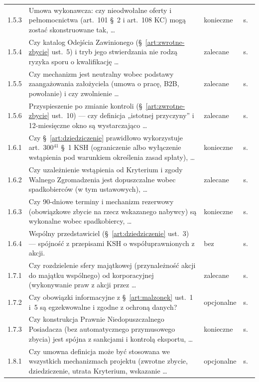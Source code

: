 \documentclass[12pt,a4paper]{report}
\begin{document}
{\begin{longtable}{@{}p{1.2cm} p{9.6cm} p{2.3cm} p{1.4cm}@{}}
1.5.3 & Umowa wykonawcza: czy nieodwołalne oferty i pełnomocnictwa (art.~101 §~2 i art.~108 KC) mogą zostać skonstruowane tak, \ldots & konieczne & s.~\pageref{memo:1.5.3} \\
1.5.4 & Czy katalog Odejścia Zawinionego (§~\ref{art:zwrotne-zbycie} ust.~5) i tryb jego stwierdzania nie rodzą ryzyka sporu o kwalifikację \ldots & zalecane & s.~\pageref{memo:1.5.4} \\
1.5.5 & Czy mechanizm jest neutralny wobec podstawy zaangażowania założyciela (umowa o pracę, B2B, powołanie) i czy zwolnienie \ldots & zalecane & s.~\pageref{memo:1.5.5} \\
1.5.6 & Przyspieszenie po zmianie kontroli (§~\ref{art:zwrotne-zbycie} ust.~10) --- czy definicja „istotnej przyczyny” i 12-miesięczne okno są wystarczająco \ldots & zalecane & s.~\pageref{memo:1.5.6} \\
1.6.1 & Czy §~\ref{art:dziedziczenie} prawidłowo wykorzystuje art.~300$^{41}$ §~1 KSH (ograniczenie albo wyłączenie wstąpienia pod warunkiem określenia zasad spłaty), \ldots & konieczne & s.~\pageref{memo:1.6.1} \\
1.6.2 & Czy uzależnienie wstąpienia od Kryterium i zgody Walnego Zgromadzenia jest dopuszczalne wobec spadkobierców (w tym ustawowych), \ldots & zalecane & s.~\pageref{memo:1.6.2} \\
1.6.3 & Czy 90-dniowe terminy i mechanizm rezerwowy (obowiązkowe zbycie na rzecz wskazanego nabywcy) są wykonalne wobec spadkobiercy, \ldots & konieczne & s.~\pageref{memo:1.6.3} \\
1.6.4 & Wspólny przedstawiciel (§~\ref{art:dziedziczenie} ust.~3) --- spójność z przepisami KSH o współuprawnionych z akcji. & bez & s.~\pageref{memo:1.6.4} \\
1.7.1 & Czy rozdzielenie sfery majątkowej (przynależność akcji do majątku wspólnego) od korporacyjnej (wykonywanie praw z akcji przez \ldots & zalecane & s.~\pageref{memo:1.7.1} \\
1.7.2 & Czy obowiązki informacyjne z §~\ref{art:malzonek} ust.~1 i~5 są egzekwowalne i zgodne z ochroną danych? & opcjonalne & s.~\pageref{memo:1.7.2} \\
1.7.3 & Czy konstrukcja Prawnie Niedopuszczalnego Posiadacza (bez automatycznego przymusowego zbycia) jest spójna z sankcjami i kontrolą eksportu, \ldots & konieczne & s.~\pageref{memo:1.7.3} \\
1.8.1 & Czy umowna definicja może być stosowana we wszystkich mechanizmach projektu (zwrotne zbycie, dziedziczenie, utrata Kryterium, wskazanie \ldots & opcjonalne & s.~\pageref{memo:1.8.1} \\

\end{longtable}}
\end{document}
